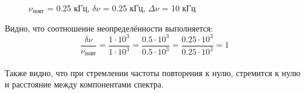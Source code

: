 \documentclass[a4paper,12pt]{article} %
\begin{document}
\begin{enumerate}
\begin{figure}[H]
		      \vfill
		      \begin{minipage}[h]{0.47\linewidth}
			       $\nu_\text{повт}$  = 0.25 кГц, $\delta \nu$ = 0.25 кГц, $\Delta \nu$ = 10 кГц \\
		      \end{minipage}
		      \hfill
		      \caption{}
		      \label{ris:experimentalcorrelationsignals}
	      \end{figure}

	      Видно, что соотношение неопределённости выполняется:
	      $$ \frac{\delta \nu}{\nu_\text{повт}} = \frac{1\cdot10^3}{1\cdot10^3} = \frac{0.5\cdot10^3}{0.5\cdot10^3} = \frac{0.25\cdot10^3}{0.25\cdot10^3} = 1 $$\\

	      Также видно, что при стремлении частоты повторения к нулю, стремится к нулю и расстояние между компонентами спектра.

\end{enumerate}



















\end{document}

